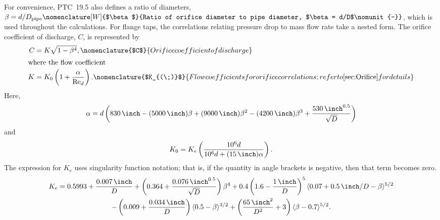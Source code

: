 For convenience, PTC~19.5 also defines a ratio of diameters, 
$\beta = {d}/{D_{\text{pipe}}}%
\nomenclature[W]{$\beta$}{Ratio of orifice diameter to pipe diameter, $\beta = d/D$\nomunit{-}}$,
which is used throughout the calculations.
For flange taps, the correlations relating pressure drop to mass flow rate take a nested form.
The orifice coefficient of discharge, $C$, is represented by
\begin{align}
C &= K\sqrt{1-\beta^4},
\nomenclature{$C$}{Orifice coefficient of discharge\nomunit{-}}\\
\shortintertext{where the flow coefficient}
K &= K_0 \left(1+\frac{\alpha}{\RE_d}\right).
\nomenclature{$K_{(\;)}$}{Flow coefficients for orifice correlations; refer to \cref{sec:Orifice} for details\nomunit{-}}
\end{align}
Here,
\begin{equation}
\alpha = d\left(\IP{830}{\per\inch} - (\IP{5000}{\per\inch})\beta + (\IP{9000}{\per\inch})\beta^2 - (\IP{4200}{\per\inch})\beta^3 + \frac{\IP{530}{\per\inch^{0.5}}}{\sqrt{D}}\right)
\end{equation}
and
\begin{equation}
K_0 = K_e \left(\frac{10^6 d}{10^6 d + (\IP{15}{\inch})\alpha}\right).
\end{equation}
The expression for $K_e$ uses singularity function notation; that is,
if the quantity in angle brackets is negative, then that term becomes zero.
\begin{multline}
K_e = 0.5993 + \frac{\IP{0.007}{\inch}}{D} + \left(0.364 + \frac{\IP{0.076}{\inch^{0.5}}}{\sqrt{D}}\right)\beta^4 
      + 0.4\left(1.6 - \frac{\IP{1}{\inch}}{D}\right)^5 \langle 0.07 + {\IP{0.5}{\inch}}/{D} - \beta\rangle^{5/2} \\
      - \left(0.009 + \frac{\IP{0.034}{\inch}}{D}\right) \langle0.5 - \beta\rangle^{3/2} 
      + \left(\frac{\IP{65}{\inch\squared}}{D^2} + 3\right)\langle\beta - 0.7\rangle^{5/2}.
\end{multline}

